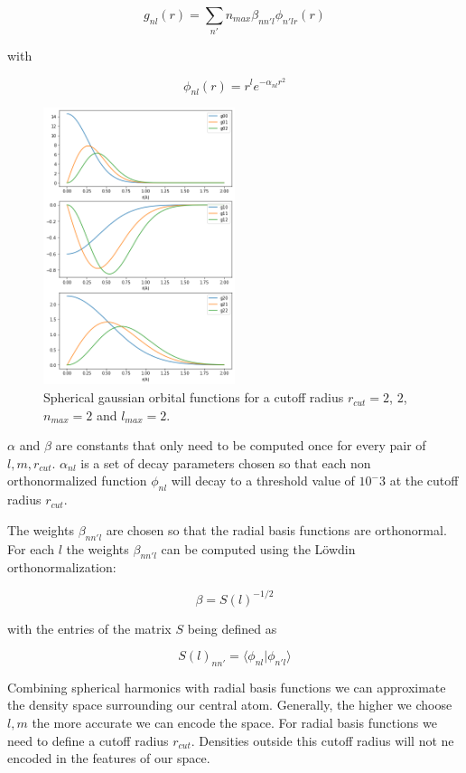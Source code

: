 $$g_{nl}(r) = \sum_{n'}{n_{max}} \beta_{nn'l} \phi_{n'lr}(r) $$

with 

$$\phi_{nl}(r) = r^l e^{-\alpha_{nl}r^2} $$ %


\begin{figure} [h]
  \centering
  \includegraphics[width=0.5\textwidth]{figures/snap/gaus_orb.png} %
  \caption{Spherical gaussian orbital functions for a cutoff radius $r_{cut}=2$, $2$, $n_{max}=2$ and $l_{max}=2$. }
  \label{fig:gaussians}
\end{figure}

$\alpha$ and $\beta$ are constants that only need to be computed once for every pair of $l,m, r_{cut}$.
$\alpha_{nl}$ is a set of decay parameters chosen so that each non orthonormalized function $\phi_{nl}$ 
will decay to a threshold value of $10^-3$ at the cutoff radius $r_{cut}$.

The weights $\beta_{nn'l}$ are chosen so that the radial basis functions are orthonormal.
For each $l$ the weights $\beta_{nn'l}$ can be computed using the Löwdin orthonormalization:

$$\beta = S(l)^{-1/2} $$

with the entries of the matrix $S$ being defined as

$$S(l)_{nn'} = \langle \phi_{nl} | \phi_{n'l} \rangle  $$

Combining spherical harmonics with radial basis functions we can approximate the density space surrounding our central atom.
Generally, the higher we choose $l, m$ the more accurate we can encode the space.
For radial basis functions we need to define a cutoff radius $r_{cut}$.
Densities outside this cutoff radius will not ne encoded in the features of our space.

